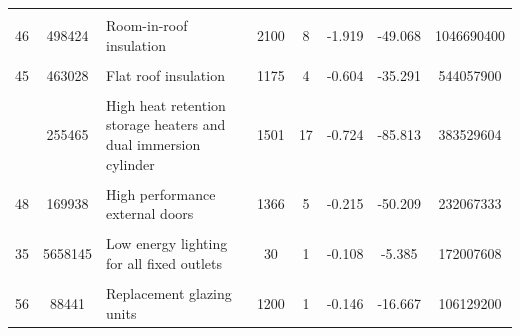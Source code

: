 \begin{table}[!h]
{\begin{tabular}[t]{cc p{7cm} ccccc}
\addlinespace
\cellcolor{gray!10}{11} & \cellcolor{gray!10}{2874681} & \cellcolor{gray!10}{Upgrade heating controls} & \cellcolor{gray!10}{400} & \cellcolor{gray!10}{2} & \cellcolor{gray!10}{-0.319} & \cellcolor{gray!10}{-15.115} & \cellcolor{gray!10}{1149872400}\\
46 & 498424 & Room-in-roof insulation & 2100 & 8 & -1.919 & -49.068 & 1046690400\\
\cellcolor{gray!10}{27} & \cellcolor{gray!10}{201053} & \cellcolor{gray!10}{Change heating to gas condensing boiler} & \cellcolor{gray!10}{5000} & \cellcolor{gray!10}{18} & \cellcolor{gray!10}{-2.203} & \cellcolor{gray!10}{-173.602} & \cellcolor{gray!10}{1005265000}\\
45 & 463028 & Flat roof insulation & 1175 & 4 & -0.604 & -35.291 & 544057900\\
\cellcolor{gray!10}{5} & \cellcolor{gray!10}{1850553} & \cellcolor{gray!10}{Increase loft insulation to 270 mm} & \cellcolor{gray!10}{225} & \cellcolor{gray!10}{3} & \cellcolor{gray!10}{-0.452} & \cellcolor{gray!10}{-26.047} & \cellcolor{gray!10}{416374425}\\
\addlinespace
59 & 255465 & High heat retention storage heaters and dual immersion cylinder & 1501 & 17 & -0.724 & -85.813 & 383529604\\
\cellcolor{gray!10}{60} & \cellcolor{gray!10}{254942} & \cellcolor{gray!10}{High heat retention storage heaters} & \cellcolor{gray!10}{1346} & \cellcolor{gray!10}{9} & \cellcolor{gray!10}{-0.489} & \cellcolor{gray!10}{-64.509} & \cellcolor{gray!10}{343177426}\\
48 & 169938 & High performance external doors & 1366 & 5 & -0.215 & -50.209 & 232067333\\
\cellcolor{gray!10}{50} & \cellcolor{gray!10}{276928} & \cellcolor{gray!10}{Flue gas heat recovery device in conjunction with boiler} & \cellcolor{gray!10}{650} & \cellcolor{gray!10}{4} & \cellcolor{gray!10}{0.562} & \cellcolor{gray!10}{-42.050} & \cellcolor{gray!10}{180003200}\\
35 & 5658145 & Low energy lighting for all fixed outlets & 30 & 1 & -0.108 & -5.385 & 172007608\\
\addlinespace
\cellcolor{gray!10}{4} & \cellcolor{gray!10}{559005} & \cellcolor{gray!10}{Hot water cylinder thermostat} & \cellcolor{gray!10}{300} & \cellcolor{gray!10}{4} & \cellcolor{gray!10}{-0.663} & \cellcolor{gray!10}{-32.833} & \cellcolor{gray!10}{167701500}\\
56 & 88441 & Replacement glazing units & 1200 & 1 & -0.146 & -16.667 & 106129200\\

\end{tabular}}
\end{table}
